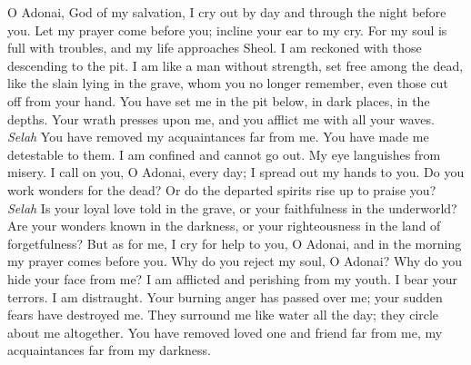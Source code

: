\begin{biblechapter} %
 O Adonai, God of my salvation, 
I cry out by day and through the night before you.
\verse Let my prayer come before you; 
incline your ear to my cry.
\verse For my soul is full with troubles, 
and my life approaches Sheol.
\verse I am reckoned with those descending to the pit. 
I am like a man without strength,
\verse set free among the dead, 
like the slain lying in the grave, 
whom you no longer remember, 
even those cut off from your hand.
\verse You have set me in the pit below, 
in dark places, in the depths.
\verse Your wrath presses upon me, 
and you afflict me with all your waves. \textit{Selah}
\verse You have removed my acquaintances far from me. 
You have made me detestable to them. 
I am confined and cannot go out.
\verse My eye languishes from misery. 
I call on you, O Adonai, every day; 
I spread out my hands to you.
\verse Do you work wonders for the dead? 
Or do the departed spirits rise up to praise you? \textit{Selah}
\verse Is your loyal love told in the grave, 
or your faithfulness in the underworld?
\verse Are your wonders known in the darkness, 
or your righteousness in the land of forgetfulness?
\verse But as for me, I cry for help to you, O Adonai, 
and in the morning my prayer comes before you.
\verse Why do you reject my soul, O Adonai? 
Why do you hide your face from me?
\verse I am afflicted and perishing from my youth. 
I bear your terrors. I am distraught.
\verse Your burning anger has passed over me; 
your sudden fears have destroyed me.
\verse They surround me like water all the day; 
they circle about me altogether.
\verse You have removed loved one and friend far from me, 
my acquaintances far from my darkness.
\end{biblechapter}

